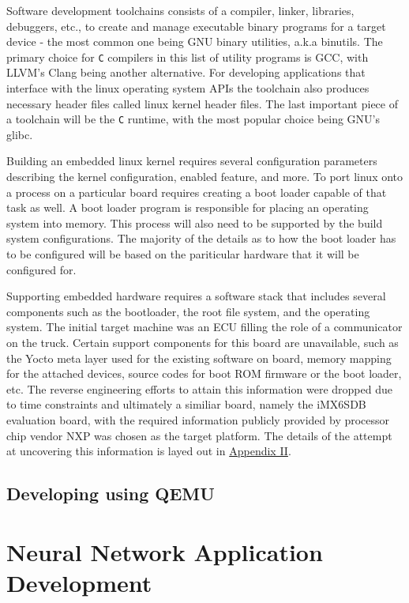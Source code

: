 Software development toolchains consists of a compiler, linker, libraries, debuggers, etc., to create and manage executable binary programs for a target device - the most common one being GNU binary utilities, a.k.a binutils. The primary choice for \verb!C! compilers in this list of utility programs is GCC, with LLVM's Clang being another alternative. For developing applications that interface with the linux operating system APIs the toolchain also produces necessary header files called linux kernel header files. The last important piece of a toolchain will be the \verb!C! runtime, with the most popular choice being GNU's glibc.

Building an embedded linux kernel requires several configuration parameters describing the kernel configuration, enabled feature, and more. To port linux onto a process on a particular board requires creating a boot loader capable of that task as well. A boot loader program is responsible for placing an operating system into memory. This process will also need to be supported by the build system configurations. The majority of the details as to how the boot loader has to be configured will be based on the pariticular hardware that it will be configured for.

Supporting embedded hardware requires a software stack that includes several components such as the bootloader, the root file system, and the operating system. The initial target machine was an ECU filling the role of a communicator on the truck. Certain support components for this board are unavailable, such as the Yocto meta layer used for the existing software on board, memory mapping for the attached devices, source codes for boot ROM firmware or the boot loader, etc. The reverse engineering efforts to attain this information were dropped due to time constraints and ultimately a similiar board, namely the iMX6SDB evaluation board, with the required information publicly provided by processor chip vendor NXP was chosen as the target platform. The details of the attempt at uncovering this information is layed out in \hyperref[rtc-c300]{Appendix II}.

\subsection{Developing using QEMU}

\section{Neural Network Application Development}

